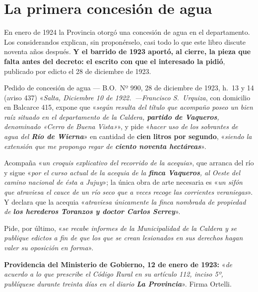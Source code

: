 \section{La primera concesión de agua}

En enero de 1924 la Provincia otorgó una concesión de agua en el departamento. Los
considerandos explican, sin proponérselo, casi todo lo que este libro discute noventa años
después. \textbf{Y el barrido de 1923 aportó, al cierre, la pieza que falta antes del decreto:
el escrito con que el interesado la pidió}, publicado por edicto el 28 de diciembre de 1923.

\begin{ficha}{Pedido de concesión de agua --- B.O.\ Nº 990, 28 de diciembre de 1923, h.\ 13 y 14 (aviso 437)}
«\textit{Salta, Diciembre 10 de 1922.\ ---Francisco S.\ Urquiza},
con domicilio en Balcarce 415, expone que «\textit{según resulta del título que acompaño poseo
un bien raíz situado en el departamento de la Caldera, \textbf{partido de Vaqueros}, denominado
«Cerro de Buena Vista»}», y pide «\textit{hacer uso de los sobrantes de agua del \textbf{Río de
Wierna}}» en cantidad de \textbf{cien litros por segundo}, «\textit{siendo la extensión que me
propongo regar de \textbf{ciento noventa hectáreas}}».

Acompaña «\textit{un croquis explicativo del recorrido de la acequia}», que arranca del río y
sigue «\textit{por el curso actual de la acequia de la \textbf{finca Vaqueros}, al Oeste del
camino nacional de ésta a Jujuy}»; la única obra de arte necesaria es «\textit{un sifón que
atraviesa el cauce de un río seco que a veces recoge las corrientes veraniegas}». Y declara que
la acequia «\textit{atraviesa únicamente la finca nombrada de propiedad de \textbf{los herederos
Toranzos y doctor Carlos Serrey}}».

Pide, por último, «\textit{se recabe informes de la Municipalidad de la Caldera y se publique
edictos a fin de que los que se crean lesionados en sus derechos hagan valer su oposición en
forma}».

\textbf{Providencia del Ministerio de Gobierno, 12 de enero de 1923:} «\textit{de acuerdo a lo
que prescribe el Código Rural en su artículo 112, inciso 5º, publíquese durante treinta días en
el diario \textbf{La Provincia}}». Firma Ortelli.
\end{ficha}

